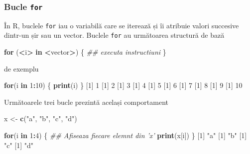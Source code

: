 \documentclass[]{article}
\newenvironment{Shaded}{\begin{snugshade}}{\end{snugshade}}
\newcommand{\CommentTok}[1]{\textcolor[rgb]{0.56,0.35,0.01}{\textit{#1}}}
\newcommand{\ControlFlowTok}[1]{\textcolor[rgb]{0.13,0.29,0.53}{\textbf{#1}}}
\newcommand{\DecValTok}[1]{\textcolor[rgb]{0.00,0.00,0.81}{#1}}
\newcommand{\KeywordTok}[1]{\textcolor[rgb]{0.13,0.29,0.53}{\textbf{#1}}}
\newcommand{\NormalTok}[1]{#1}
\newcommand{\OperatorTok}[1]{\textcolor[rgb]{0.81,0.36,0.00}{\textbf{#1}}}
\newcommand{\StringTok}[1]{\textcolor[rgb]{0.31,0.60,0.02}{#1}}
\newcounter{exo}[section]
\begin{document}
\hypertarget{bucle-for}{%
\subsubsection{\texorpdfstring{Bucle
\texttt{for}}{Bucle for}}\label{bucle-for}}

În R, buclele \texttt{for} iau o variabilă care se iterează și îi
atribuie valori succesive dintr-un șir sau un vector. Buclele
\texttt{for} au următoarea structură de bază

\begin{Shaded}
\begin{Highlighting}[]
\ControlFlowTok{for}\NormalTok{ (}\OperatorTok{<}\NormalTok{i}\OperatorTok{>}\StringTok{ }\ControlFlowTok{in} \OperatorTok{<}\NormalTok{vector}\OperatorTok{>}\NormalTok{) \{}
        \CommentTok{## executa instructiuni}
\NormalTok{\} }
\end{Highlighting}
\end{Shaded}

de exemplu

\begin{Shaded}
\begin{Highlighting}[]
\ControlFlowTok{for}\NormalTok{(i }\ControlFlowTok{in} \DecValTok{1}\OperatorTok{:}\DecValTok{10}\NormalTok{) \{}
        \KeywordTok{print}\NormalTok{(i)}
\NormalTok{\}}
\NormalTok{[}\DecValTok{1}\NormalTok{] }\DecValTok{1}
\NormalTok{[}\DecValTok{1}\NormalTok{] }\DecValTok{2}
\NormalTok{[}\DecValTok{1}\NormalTok{] }\DecValTok{3}
\NormalTok{[}\DecValTok{1}\NormalTok{] }\DecValTok{4}
\NormalTok{[}\DecValTok{1}\NormalTok{] }\DecValTok{5}
\NormalTok{[}\DecValTok{1}\NormalTok{] }\DecValTok{6}
\NormalTok{[}\DecValTok{1}\NormalTok{] }\DecValTok{7}
\NormalTok{[}\DecValTok{1}\NormalTok{] }\DecValTok{8}
\NormalTok{[}\DecValTok{1}\NormalTok{] }\DecValTok{9}
\NormalTok{[}\DecValTok{1}\NormalTok{] }\DecValTok{10}
\end{Highlighting}
\end{Shaded}

Următoarele trei bucle prezintă același comportament

\begin{Shaded}
\begin{Highlighting}[]
\NormalTok{x <-}\StringTok{ }\KeywordTok{c}\NormalTok{(}\StringTok{"a"}\NormalTok{, }\StringTok{"b"}\NormalTok{, }\StringTok{"c"}\NormalTok{, }\StringTok{"d"}\NormalTok{)}

\ControlFlowTok{for}\NormalTok{(i }\ControlFlowTok{in} \DecValTok{1}\OperatorTok{:}\DecValTok{4}\NormalTok{) \{}
        \CommentTok{## Afiseaza fiecare elemnt din 'x'}
        \KeywordTok{print}\NormalTok{(x[i])  }
\NormalTok{\}}
\NormalTok{[}\DecValTok{1}\NormalTok{] }\StringTok{"a"}
\NormalTok{[}\DecValTok{1}\NormalTok{] }\StringTok{"b"}
\NormalTok{[}\DecValTok{1}\NormalTok{] }\StringTok{"c"}
\NormalTok{[}\DecValTok{1}\NormalTok{] }\StringTok{"d"}
\end{Highlighting}
\end{Shaded}
\end{document}
